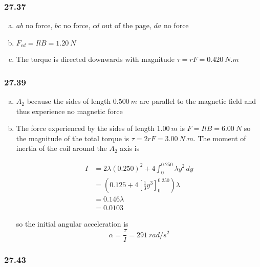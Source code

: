 \documentclass{article}
\begin{document}
\subsubsection{27.37}

\begin{enumerate}[(a)]
  \item $ab$ no force, $bc$ no force, $cd$ out of the page, $da$ no force

  \item $F_{cd} = I l B = \qty{1.20}{N}$

  \item The torque is directed downwards with magnitude $\tau = r F = \qty{0.420}{N.m}$
\end{enumerate}

\subsubsection{27.39}

\begin{enumerate}[(a)]
  \item $A_2$ because the sides of length $\qty{0.500}{m}$ are parallel to the magnetic field and thus experience no magnetic force

  \item The force experienced by the sides of length $\qty{1.00}{m}$ is $F = I l B = \qty{6.00}{N}$ so the magnitude of the total torque is $\tau = 2 r F = \qty{3.00}{N.m}$. The moment of inertia of the coil around the $A_2$ axis is

        \begin{align*}
          I & = 2 \lambda (0.250)^2 + 4 \int_0^{0.250} \lambda y^2 \,dy                   \\
            & = \left( 0.125 + 4 \left[ \frac{1}{3} y^3 \right]_0^{0.250} \right) \lambda \\
            & = 0.146 \lambda                                                             \\
            & = 0.0103
        \end{align*}

        so the initial angular acceleration is \[\alpha = \frac{\tau}{I} = \qty{291}{rad/s^2}\]
\end{enumerate}

\subsubsection{27.43}
\end{document}
